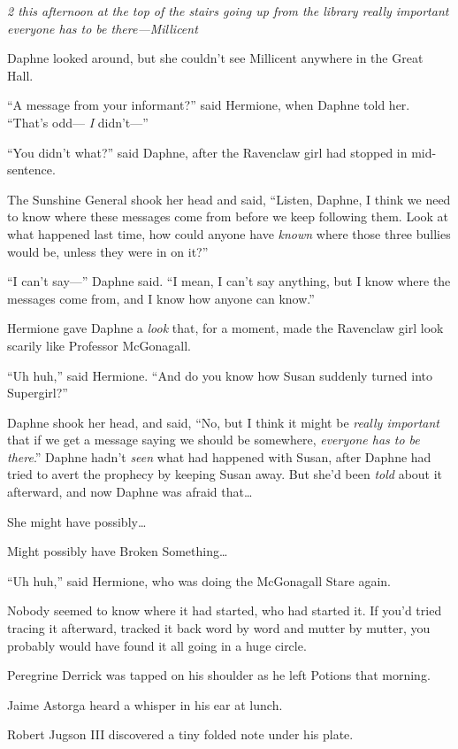 \emph{2 this afternoon at the top of the stairs going up from the library \emph{really important} everyone has to be there—Millicent}

Daphne looked around, but she couldn’t see Millicent anywhere in the Great Hall.

“A message from your informant?” said Hermione, when Daphne told her. “That’s odd— \emph{I} didn’t—”

“You didn’t what?” said Daphne, after the Ravenclaw girl had stopped in mid-sentence.

The Sunshine General shook her head and said, “Listen, Daphne, I think we need to know where these messages come from before we keep following them. Look at what happened last time, how could anyone have \emph{known} where those three bullies would be, unless they were in on it?”

“I can’t say—” Daphne said. “I mean, I can’t say anything, but I know where the messages come from, and I know how anyone can know.”

Hermione gave Daphne a \emph{look} that, for a moment, made the Ravenclaw girl look scarily like Professor McGonagall.

“Uh huh,” said Hermione. “And do you know how Susan suddenly turned into Supergirl?”

Daphne shook her head, and said, “No, but I think it might be \emph{really important} that if we get a message saying we should be somewhere, \emph{everyone has to be there}.” Daphne hadn’t \emph{seen} what had happened with Susan, after Daphne had tried to avert the prophecy by keeping Susan away. But she’d been \emph{told} about it afterward, and now Daphne was afraid that…

She might have possibly…

Might possibly have Broken Something…

“Uh huh,” said Hermione, who was doing the McGonagall Stare again.

\later

Nobody seemed to know where it had started, who had started it. If you’d tried tracing it afterward, tracked it back word by word and mutter by mutter, you probably would have found it all going in a huge circle.

Peregrine Derrick was tapped on his shoulder as he left Potions that morning.

Jaime Astorga heard a whisper in his ear at lunch.

Robert Jugson III discovered a tiny folded note under his plate.

